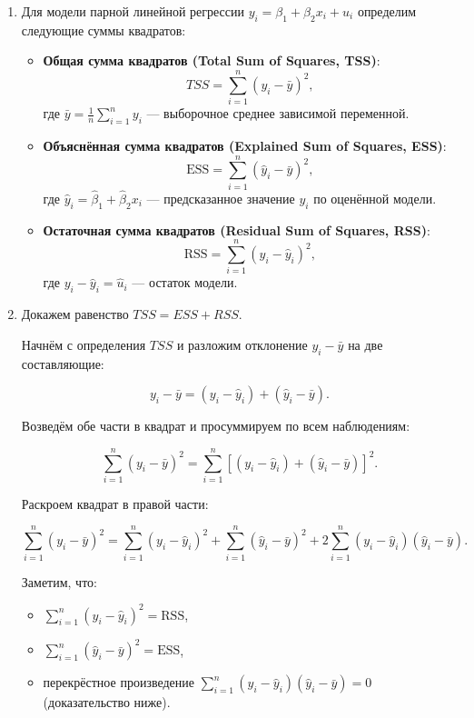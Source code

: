 \documentclass[12pt]{article}
\newcommand{\RSS}{RSS}
\newcommand{\ESS}{ESS}
\newcommand{\TSS}{TSS}
\begin{document}
\begin{sol}
\begin{enumerate}
    \item Для модели парной линейной регрессии \( y_i = \beta_1 + \beta_2 x_i + u_i \) определим следующие суммы квадратов:

\begin{itemize}
    \item \textbf{Общая сумма квадратов (Total Sum of Squares, TSS)}:
    \[
    \TSS = \sum_{i=1}^n (y_i - \bar{y})^2,
    \]
    где \(\bar{y} = \frac{1}{n} \sum_{i=1}^n y_i\) — выборочное среднее зависимой переменной.

    \item \textbf{Объяснённая сумма квадратов (Explained Sum of Squares, ESS)}:
    \[
    \text{ESS} = \sum_{i=1}^n (\hat{y}_i - \bar{y})^2,
    \]
    где \(\hat{y}_i = \hat{\beta}_1 + \hat{\beta}_2 x_i\) — предсказанное значение \(y_i\) по оценённой модели.

    \item \textbf{Остаточная сумма квадратов (Residual Sum of Squares, RSS)}:
    \[
    \text{RSS} = \sum_{i=1}^n (y_i - \hat{y}_i)^2,
    \]
    где \(y_i - \hat{y}_i = \hat{u}_i\) — остаток модели.
\end{itemize}

\item Докажем равенство $\TSS = \ESS + \RSS$.

Начнём с определения $\TSS$ и разложим отклонение $y_i - \bar{y}$ на две составляющие:

\[
y_i - \bar{y} = (y_i - \hat{y}_i) + (\hat{y}_i - \bar{y}).
\]

Возведём обе части в квадрат и просуммируем по всем наблюдениям:

\[
\sum_{i=1}^n (y_i - \bar{y})^2 = \sum_{i=1}^n \left[ (y_i - \hat{y}_i) + (\hat{y}_i - \bar{y}) \right]^2.
\]

Раскроем квадрат в правой части:

\[
\sum_{i=1}^n (y_i - \bar{y})^2 = \sum_{i=1}^n (y_i - \hat{y}_i)^2 + \sum_{i=1}^n (\hat{y}_i - \bar{y})^2 + 2 \sum_{i=1}^n (y_i - \hat{y}_i)(\hat{y}_i - \bar{y}).
\]

Заметим, что:
\begin{itemize}
    \item \(\sum_{i=1}^n (y_i - \hat{y}_i)^2 = \text{RSS}\),
    \item \(\sum_{i=1}^n (\hat{y}_i - \bar{y})^2 = \text{ESS}\),
    \item перекрёстное произведение \(\sum_{i=1}^n (y_i - \hat{y}_i)(\hat{y}_i - \bar{y}) = 0\) (доказательство ниже).
\end{itemize}


\end{enumerate}
\end{sol}
\end{document}
